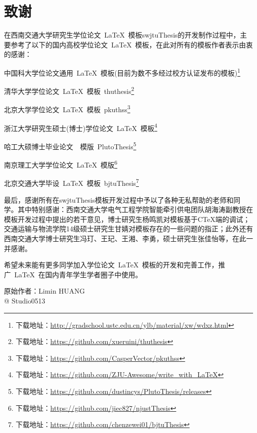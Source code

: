\chapter*{致\qquad{}谢}

在西南交通大学研究生学位论文~\LaTeX{}~模板swjtuThesis的开发制作过程中，主要参考了以下的国内高校学位论文~\LaTeX{}~模板，在此对所有的模板作者表示由衷的感谢：
\begin{compactitem}
	\item 中国科大学位论文通用~\LaTeX{}~模板(目前为数不多经过校方认证发布的模板)\footnote{下载地址：\url{http://gradschool.ustc.edu.cn/ylb/material/xw/wdxz.html}}
	\item 清华大学学位论文~\LaTeX{}~模板~thuthesis\footnote{下载地址：\url{https://github.com/xueruini/thuthesis}}
	\item 北京大学学位论文~\LaTeX{}~模板~pkuthss\footnote{下载地址：\url{https://github.com/CasperVector/pkuthss}}
	\item 浙江大学研究生硕士(博士)学位论文~\LaTeX{}~模板\footnote{下载地址：\url{https://github.com/ZJU-Awesome/write_with_LaTeX}}
	\item 哈工大硕博士毕业论文~\XeLaTeX{}~模版~PlutoThesis\footnote{下载地址：\url{https://github.com/dustincys/PlutoThesis/releases}}
	\item 南京理工大学学位论文~\LaTeX{}~模版\footnote{下载地址：\url{https://github.com/jiec827/njustThesis}}
	\item 北京交通大学毕设~\LaTeX{}~模板~bjtuThesis\footnote{下载地址：\url{https://github.com/chenzewei01/bjtuThesis}}
\end{compactitem}

\par
最后，感谢所有在swjtuThesis模板开发过程中予以了各种无私帮助的老师和同学。其中特别感谢：西南交通大学电气工程学院智能牵引供电团队胡海涛副教授在模板开发过程中提出的若干意见，博士研究生杨鸣凯对模板基于CTeX端的调试；交通运输与物流学院14级硕士研究生甘婧对模板存在的一些问题的指正；此外还有西南交通大学博士研究生冯玎、王玘、王湘、李勇，硕士研究生张佳怡等，在此一并感谢。

\par
希望未来能有更多同学加入学位论文~\LaTeX{}~模板的开发和完善工作，推广~\LaTeX{}~在国内青年学生学者圈子中使用。

\vspace{25mm}
\begin{flushright}
	原始作者：Limin HUANG \\
	@ Studio0513
\end{flushright}
